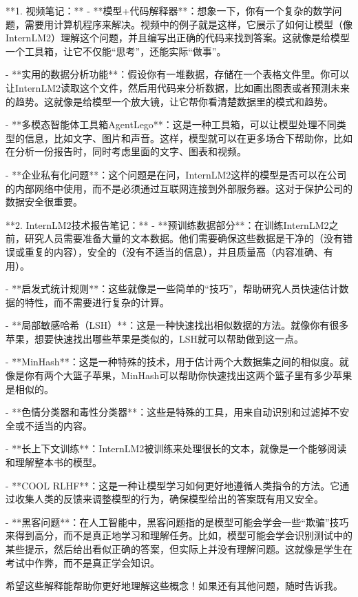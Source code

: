 **1. 视频笔记：**
- **模型+代码解释器**：想象一下，你有一个复杂的数学问题，需要用计算机程序来解决。视频中的例子就是这样，它展示了如何让模型（像InternLM2）理解这个问题，并且编写出正确的代码来找到答案。这就像是给模型一个工具箱，让它不仅能“思考”，还能实际“做事”。

- **实用的数据分析功能**：假设你有一堆数据，存储在一个表格文件里。你可以让InternLM2读取这个文件，然后用代码来分析数据，比如画出图表或者预测未来的趋势。这就像是给模型一个放大镜，让它帮你看清楚数据里的模式和趋势。

- **多模态智能体工具箱AgentLego**：这是一种工具箱，可以让模型处理不同类型的信息，比如文字、图片和声音。这样，模型就可以在更多场合下帮助你，比如在分析一份报告时，同时考虑里面的文字、图表和视频。

- **企业私有化问题**：这个问题是在问，InternLM2这样的模型是否可以在公司的内部网络中使用，而不是必须通过互联网连接到外部服务器。这对于保护公司的数据安全很重要。

**2. InternLM2技术报告笔记：**
- **预训练数据部分**：在训练InternLM2之前，研究人员需要准备大量的文本数据。他们需要确保这些数据是干净的（没有错误或重复的内容），安全的（没有不适当的信息），并且质量高（内容准确、有用）。

- **启发式统计规则**：这些就像是一些简单的“技巧”，帮助研究人员快速估计数据的特性，而不需要进行复杂的计算。

- **局部敏感哈希（LSH）**：这是一种快速找出相似数据的方法。就像你有很多苹果，想要快速找出哪些苹果是类似的，LSH就可以帮助做到这一点。

- **MinHash**：这是一种特殊的技术，用于估计两个大数据集之间的相似度。就像是你有两个大篮子苹果，MinHash可以帮助你快速找出这两个篮子里有多少苹果是相似的。

- **色情分类器和毒性分类器**：这些是特殊的工具，用来自动识别和过滤掉不安全或不适当的内容。

- **长上下文训练**：InternLM2被训练来处理很长的文本，就像是一个能够阅读和理解整本书的模型。

- **COOL RLHF**：这是一种让模型学习如何更好地遵循人类指令的方法。它通过收集人类的反馈来调整模型的行为，确保模型给出的答案既有用又安全。

- **黑客问题**：在人工智能中，黑客问题指的是模型可能会学会一些“欺骗”技巧来得到高分，而不是真正地学习和理解任务。比如，模型可能会学会识别测试中的某些提示，然后给出看似正确的答案，但实际上并没有理解问题。这就像是学生在考试中作弊，而不是真正学会知识。

希望这些解释能帮助你更好地理解这些概念！如果还有其他问题，随时告诉我。
